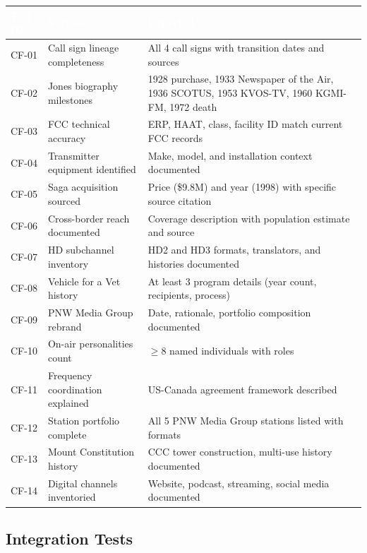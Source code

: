 \documentclass[11pt,letterpaper]{article}
\newcommand{\tableheader}[1]{\textbf{\sffamily\textcolor{white}{#1}}}
\begin{document}
\begin{center}
\begin{tabularx}{\textwidth}{C{1.3cm}L{3.5cm}X}
\toprule
{}
\tableheader{Test ID} & \tableheader{Verifies} & \tableheader{Expected} \\
\midrule
CF-01 & Call sign lineage completeness & All 4 call signs with transition dates and sources \\
CF-02 & Jones biography milestones & 1928 purchase, 1933 Newspaper of the Air, 1936 SCOTUS, 1953 KVOS-TV, 1960 KGMI-FM, 1972 death \\
CF-03 & FCC technical accuracy & ERP, HAAT, class, facility ID match current FCC records \\
CF-04 & Transmitter equipment identified & Make, model, and installation context documented \\
CF-05 & Saga acquisition sourced & Price (\$9.8M) and year (1998) with specific source citation \\
CF-06 & Cross-border reach documented & Coverage description with population estimate and source \\
CF-07 & HD subchannel inventory & HD2 and HD3 formats, translators, and histories documented \\
CF-08 & Vehicle for a Vet history & At least 3 program details (year count, recipients, process) \\
CF-09 & PNW Media Group rebrand & Date, rationale, portfolio composition documented \\
CF-10 & On-air personalities count & $\geq$8 named individuals with roles \\
CF-11 & Frequency coordination explained & US-Canada agreement framework described \\
CF-12 & Station portfolio complete & All 5 PNW Media Group stations listed with formats \\
CF-13 & Mount Constitution history & CCC tower construction, multi-use history documented \\
CF-14 & Digital channels inventoried & Website, podcast, streaming, social media documented \\
\bottomrule
\end{tabularx}
\end{center}

\subsection{Integration Tests}
\end{document}
